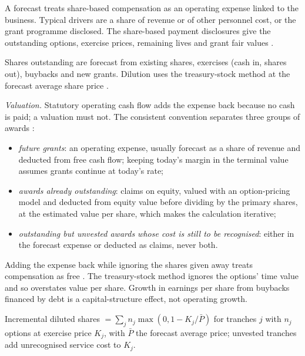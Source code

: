 \begin{qfmethod}\label{meth:share-based-compensation-modelling}
 A forecast treats share-based compensation as an operating expense linked to the business. Typical drivers are a share of revenue or of other personnel cost, or the grant programme disclosed. The share-based payment disclosures give the outstanding options, exercise prices, remaining lives and grant fair values \citep[IFRS~2 paras.~45 and~47]{eu-2023-1803-ifrs2}.

Shares outstanding are forecast from existing shares, exercises (cash in, shares out), buybacks and new grants. Dilution uses the treasury-stock method at the forecast average share price \citep[IAS~33 paras.~45--47A]{eu-2023-1803-ias33}.

\emph{Valuation.} Statutory operating cash flow adds the expense back because no cash is paid; a valuation must not. The consistent convention separates three groups of awards \citep[pp.~445--449]{investment-valuation-2012}:
\begin{itemize}
\item \emph{future grants}: an operating expense, usually forecast as a share of revenue and deducted from free cash flow; keeping today's margin in the terminal value assumes grants continue at today's rate;
\item \emph{awards already outstanding}: claims on equity, valued with an option-pricing model and deducted from equity value before dividing by the primary shares, at the estimated value per share, which makes the calculation iterative;
\item \emph{outstanding but unvested awards whose cost is still to be recognised}: either in the forecast expense or deducted as claims, never both.
\end{itemize}
Adding the expense back while ignoring the shares given away treats compensation as free \citep[slide~14]{free-cash-flow-primer-2022}. The treasury-stock method ignores the options' time value and so overstates value per share. Growth in earnings per share from buybacks financed by debt is a capital-structure effect, not operating growth.

 Incremental diluted shares $=\sum_j n_j\max(0,1-K_j/\bar P)$ for tranches $j$ with $n_j$ options at exercise price $K_j$, with $\bar P$ the forecast average price; unvested tranches add unrecognised service cost to $K_j$.


\end{qfmethod}
